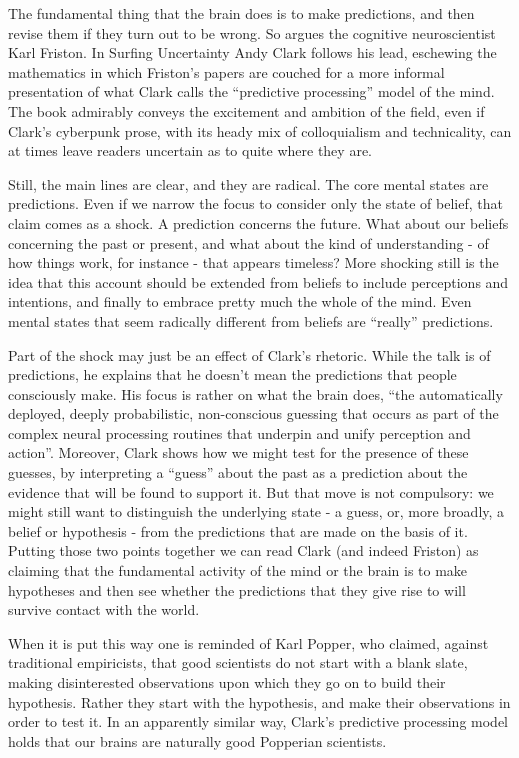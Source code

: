 \def\mytitle{Think Ahead}
\def\shorttitle{Think Ahead}
\def\myauthor{Richard Holton}


The fundamental thing that the brain does is to make predictions, and then revise them if they turn out to be wrong. So argues the cognitive neuroscientist Karl Friston. In Surfing Uncertainty Andy Clark follows his lead, eschewing the mathematics in which Friston's papers are couched for a more informal presentation of what Clark calls the ``predictive processing'' model of the mind. The book admirably conveys the excitement and ambition of the field, even if Clark's cyberpunk prose, with its heady mix of colloquialism and technicality, can at times leave readers uncertain as to quite where they are.

Still, the main lines are clear, and they are radical. The core mental states are predictions. Even if we narrow the focus to consider only the state of belief, that claim comes as a shock. A prediction concerns the future. What about our beliefs concerning the past or present, and what about the kind of understanding - of how things work, for instance - that appears timeless? More shocking still is the idea that this account should be extended from beliefs to include perceptions and intentions, and finally to embrace pretty much the whole of the mind. Even mental states that seem radically different from beliefs are ``really'' predictions.

Part of the shock may just be an effect of Clark's rhetoric. While the talk is of predictions, he explains that he doesn't mean the predictions that people consciously make. His focus is rather on what the brain does, ``the automatically deployed, deeply probabilistic, non-conscious guessing that occurs as part of the complex neural processing routines that underpin and unify perception and action''. Moreover, Clark shows how we might test for the presence of these guesses, by interpreting a ``guess'' about the past as a prediction about the evidence that will be found to support it. But that move is not compulsory: we might still want to distinguish the underlying state - a guess, or, more broadly, a belief or hypothesis - from the predictions that are made on the basis of it. Putting those two points together we can read Clark (and indeed Friston) as claiming that the fundamental activity of the mind or the brain is to make hypotheses and then see whether the predictions that they give rise to will survive contact with the world.

When it is put this way one is reminded of Karl Popper, who claimed, against traditional empiricists, that good scientists do not start with a blank slate, making disinterested observations upon which they go on to build their hypothesis. Rather they start with the hypothesis, and make their observations in order to test it. In an apparently similar way, Clark's predictive processing model holds that our brains are naturally good Popperian scientists.

